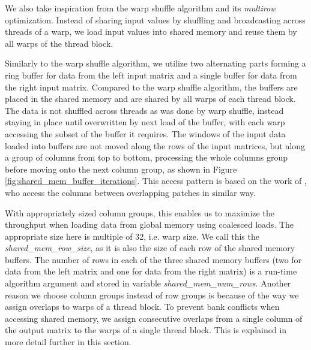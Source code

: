 We also take inspiration from the warp shuffle algorithm and its \textit{multirow} optimization. Instead of sharing input values by shuffling and broadcasting across threads of a warp, we load input values into shared memory and reuse them by all warps of the thread block.

Similarly to the warp shuffle algorithm, we utilize two alternating parts forming a ring buffer for data from the left input matrix and a single buffer for data from the right input matrix. Compared to the warp shuffle algorithm, the buffers are placed in the shared memory and are shared by all warps of each thread block. The data is not shuffled across threads as was done by warp shuffle, instead staying in place until overwritten by next load of the buffer, with each warp accessing the subset of the buffer it requires. The windows of the input data loaded into buffers are not moved along the rows of the input matrices, but along a group of columns from top to bottom, processing the whole columns group before moving onto the next column group, as shown in Figure \ref{fig:shared_mem_buffer_iterations}. This access pattern is based on the work of \citet{paper:krulis_3d_block}, who access the columns between overlapping patches in similar way.


With appropriately sized column groups, this enables us to maximize the throughput when loading data from global memory using coalesced loads. The appropriate size here is multiple of 32, i.e. warp size.  We call this the \textit{shared\_mem\_row\_size}, as it is also the size of each row of the shared memory buffers. The number of rows in each of the three shared memory buffers (two for data from the left matrix and one for data from the right matrix) is a run-time algorithm argument and stored in variable \textit{shared\_mem\_num\_rows}.
Another reason we choose column groups instead of row groups is because of the way we assign overlaps to warps of a thread block. To prevent bank conflicts when accessing shared memory, we assign consecutive overlaps from a single column of the output matrix to the warps of a single thread block. This is explained in more detail further in this section.


